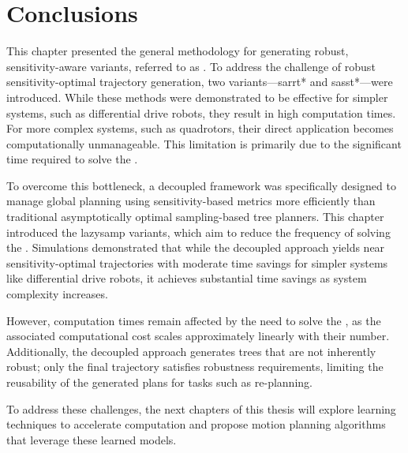 \section{Conclusions}\label{sec:concl}

This chapter presented the general methodology for generating robust, sensitivity-aware variants, referred to as . 
To address the challenge of robust sensitivity-optimal trajectory generation, two variants—\gls{sarrt*} and \gls{sasst*}—were introduced. 
While these methods were demonstrated to be effective for simpler systems, such as differential drive robots, they result in high computation times. 
For more complex systems, such as quadrotors, their direct application becomes computationally unmanageable.
This limitation is primarily due to the significant time required to solve the .

To overcome this bottleneck, a decoupled framework was specifically designed to manage global planning using sensitivity-based metrics more efficiently than traditional asymptotically optimal sampling-based tree planners. 
This chapter introduced the \gls{lazysamp} variants, which aim to reduce the frequency of solving the . 
Simulations demonstrated that while the decoupled approach yields near sensitivity-optimal trajectories with moderate time savings for simpler systems like differential drive robots, it achieves substantial time savings as system complexity increases.

However, computation times remain affected by the need to solve the , as the associated computational cost scales approximately linearly with their number.
Additionally, the decoupled approach generates trees that are not inherently robust; only the final trajectory satisfies robustness requirements, limiting the reusability of the generated plans for tasks such as re-planning.

To address these challenges, the next chapters of this thesis will explore learning techniques to accelerate  computation and propose motion planning algorithms that leverage these learned models.